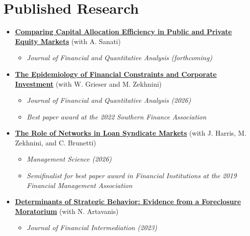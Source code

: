 \documentclass{article}[12]
\begin{document}
\vspace*{0.1cm}

\section{Published Research}

\begin{itemize}[itemsep=1.3em]
\item[$\bullet$] \href{https://papers.ssrn.com/abstract=4403578}{\textbf{Comparing Capital Allocation Efficiency in Public and Private Equity Markets}} (with A. Sanati)
\begin{itemize}
    \item[-] \textit{Journal of Financial and Quantitative Analysis (forthcoming)}
\end{itemize}

\item[$\bullet$] \href{https://doi.org/10.1017/S0022109025000171}{\textbf{The Epidemiology of Financial Constraints and Corporate Investment}} (with W. Grieser and M. Zekhnini)
\begin{itemize}
    \item[-] \textit{Journal of Financial and Quantitative Analysis (2026)}
    \item[-] \textit{Best paper award at the 2022 Southern Finance Association}
\end{itemize}

\item[$\bullet$] \href{https://papers.ssrn.com/sol3/papers.cfm?abstract_id=3295980}{\textbf{The Role of Networks in Loan Syndicate Markets}} (with J. Harris, M. Zekhnini, and C. Brunetti)
\begin{itemize}
    \item[-] \textit{Management Science (2026)}
    \item[-] \textit{Semifinalist for best paper award in Financial Institutions at the 2019 Financial Management Association}
\end{itemize}

\item[$\bullet$] \href{https://papers.ssrn.com/sol3/papers.cfm?abstract_id=2946595}{\textbf{Determinants of Strategic Behavior: Evidence from a Foreclosure Moratorium}} (with N. Artavanis)
\begin{itemize}
    \item[-] \textit{Journal of Financial Intermediation (2023)}
\end{itemize}


\end{itemize}
\end{document}
